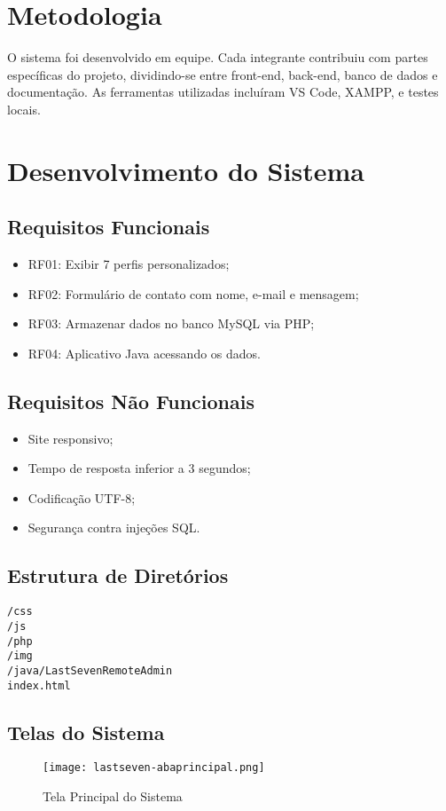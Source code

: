 \documentclass[12pt]{article}
\begin{document}
\section{Metodologia}
O sistema foi desenvolvido em equipe. Cada integrante contribuiu com partes específicas do projeto, dividindo-se entre front-end, back-end, banco de dados e documentação. As ferramentas utilizadas incluíram VS Code, XAMPP, e testes locais.

\section{Desenvolvimento do Sistema}
\subsection{Requisitos Funcionais}
\begin{itemize}
    \item RF01: Exibir 7 perfis personalizados;
    \item RF02: Formulário de contato com nome, e-mail e mensagem;
    \item RF03: Armazenar dados no banco MySQL via PHP;
    \item RF04: Aplicativo Java acessando os dados.
\end{itemize}

\subsection{Requisitos Não Funcionais}
\begin{itemize}
    \item Site responsivo;
    \item Tempo de resposta inferior a 3 segundos;
    \item Codificação UTF-8;
    \item Segurança contra injeções SQL.
\end{itemize}

\subsection{Estrutura de Diretórios}
\begin{verbatim}
/css
/js
/php
/img
/java/LastSevenRemoteAdmin
index.html
\end{verbatim}

\subsection{Telas do Sistema}
\begin{figure}[H]
    \centering
    \texttt{[image: lastseven-abaprincipal.png]}
    \caption{Tela Principal do Sistema}
\end{figure}
\end{document}

